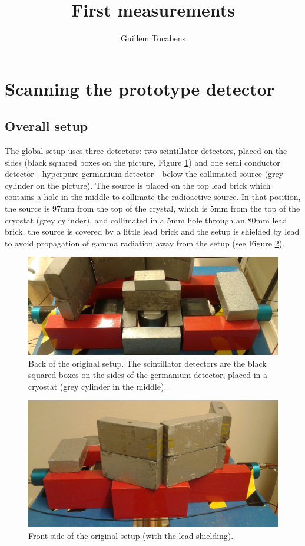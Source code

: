 \documentclass[11pt,a4paper]{article}
\author{Guillem Tocabens}
\title{First measurements}
\begin{document}
\section{Scanning the prototype detector}


\subsection{Overall setup}

The global setup uses three detectors: two scintillator detectors, placed on the sides (black squared boxes on the picture, Figure \ref{Setup}) and one semi conductor detector - hyperpure germanium detector - below the collimated source (grey cylinder on the picture). The source is placed on the top lead brick which contains a hole in the middle to collimate the radioactive source. In that position, the source is 97mm from the top of the crystal, which is 5mm from the top of the cryostat (grey cylinder), and collimated in a 5mm hole through an 80mm lead brick. the source is covered by a little lead brick and the setup is shielded by lead to avoid propagation of gamma radiation away from the setup (see Figure \ref{Setup_front}).

\begin{figure}[!h]
\centering
\includegraphics[scale=0.15]{New_setup_back.jpg}
\caption{Back of the original setup. The scintillator detectors are the black squared boxes on the sides of the germanium detector, placed in a cryostat (grey cylinder in the middle).}
\label{Setup}
\end{figure}

\begin{figure}[!h]
\centering
\includegraphics[scale=0.15]{New_setup_front.jpg}
\caption{Front side of the original setup (with the lead shielding).}
\label{Setup_front}
\end{figure}
\end{document}
